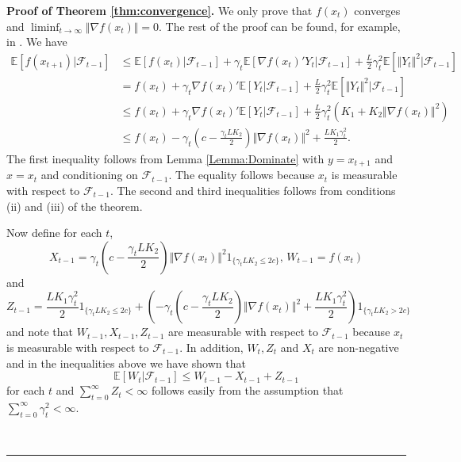 \documentclass[letter,11pt]{article}
\newenvironment {proof}[1][Proof]{\noindent \textbf {#1.} }{\ \rule {0.5em}{0.5em}}
\begin{document}
\begin{proof}[Proof of Theorem \ref{thm:convergence}]
    We  only prove that $f(x_{t})$ converges and $\liminf_{t \rightarrow \infty} \Vert \nabla f(x_{t} ) \Vert = 0$. The rest of the proof can be found, for example, in \cite{bertsekas1996neuro}. We have
 \begin{align*}
     \mathbb{E}[f(x_{t+1}) | \mathcal{F}_{t-1}  ] & \leq \mathbb{E}[f(x_{t}) | \mathcal{F}_{t-1}  ] + \gamma_{t} \mathbb{E}[ \nabla f(x_{t}) ' Y_{t}  | \mathcal{F}_{t-1} ]  + \frac{L}{2}  \gamma_{t}^{2} \mathbb{E}[\Vert Y_{t} \Vert^{2} | \mathcal{F}_{t-1}  ]  \\
     & = f(x_{t}) + \gamma_{t} \nabla f(x_{t}) ' \mathbb{E}[ Y_{t}  | \mathcal{F}_{t-1} ]  + \frac{L}{2}  \gamma_{t}^{2} \mathbb{E}[\Vert Y_{t} \Vert^{2} | \mathcal{F}_{t-1}  ] \\
     & \leq f(x_{t}) + \gamma_{t} \nabla f(x_{t}) ' \mathbb{E}[ Y_{t}  | \mathcal{F}_{t-1} ]  + \frac{L}{2}  \gamma_{t}^{2} \left (K_{1} + K_{2} \Vert \nabla f(x_{t}) \Vert ^{2} \right ) \\
     & \leq  f(x_{t}) - \gamma_{t} \left ( c - \frac{\gamma_{t}LK_{2}}{2} \right ) \Vert \nabla f(x_{t}) \Vert ^{2} + \frac{LK_{1}\gamma_{t}^{2}}{2}.
 \end{align*}
     The first inequality follows from Lemma \ref{Lemma:Dominate} with $y=x_{t+1}$ and $x = x_{t}$ and conditioning on $\mathcal{F}_{t-1}$. The equality follows because $x_{t}$ is measurable with respect to $\mathcal{F}_{t-1}$. The second and third inequalities follows from conditions (ii) and (iii) of the theorem. 

     Now define for each $t$,
     $$ X_{t-1} =  \gamma_{t} \left ( c - \frac{\gamma_{t}LK_{2}}{2} \right ) \Vert \nabla f(x_{t}) \Vert ^{2}1_{ \{ \gamma_{t}LK_{2} \leq 2c \} } \text{,    } W_{t-1} = f(x_{t})$$
     and
     $$Z_{t-1} = \frac{LK_{1}\gamma_{t}^{2}}{2}1_{ \{ \gamma_{t}LK_{2} \leq 2c \} } + \left (  - \gamma_{t} \left ( c - \frac{\gamma_{t}LK_{2}}{2} \right ) \Vert \nabla f(x_{t}) \Vert ^{2} + \frac{LK_{1}\gamma_{t}^{2}}{2} \right )   1_{ \{ \gamma_{t}LK_{2} > 2c \} }  $$
     and note that $W_{t-1},X_{t-1},Z_{t-1}$ are measurable with respect to $\mathcal{F}_{t-1}$ because $x_{t}$ is measurable with respect to $\mathcal{F}_{t-1}$. In addition, $W_{t}, Z_{t}$ and $X_{t}$ are non-negative and in the inequalities above we have shown that 
     $$\mathbb{E}[W_{t}|\mathcal{F}_{t-1}] \leq W_{t-1} - X_{t-1} + Z_{t-1}$$ 
     for each $t$ and  $\sum_{t=0}^{\infty} Z_{t}  < \infty$ follows easily from the assumption that $\sum _{t=0}^{\infty} \gamma_{t}^{2} < \infty $. 


\end{proof}
\end{document}
